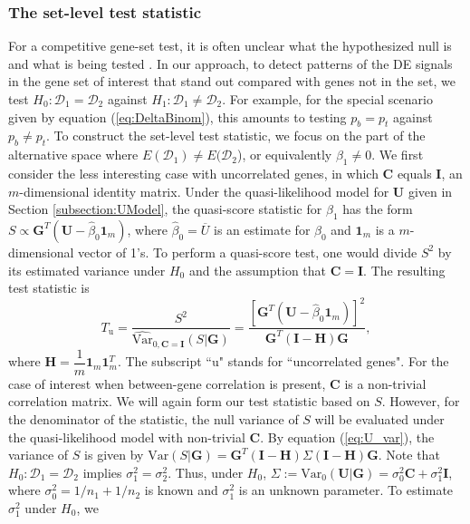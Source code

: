 \documentclass[a4,center,fleqn]{NAR}
\begin{document}
	
	\subsubsection{The set-level test statistic}\label{subsection:MEQL}
	For a competitive gene-set test, it is often unclear what the hypothesized null is and what is
	being tested \citep{barry2008statistical,wu2012camera}. In our approach, to detect patterns of 
	the DE signals in the gene set of interest that stand out compared with genes not in the set, 
	we test $H_0: \mathscr{D}_1=\mathscr{D}_2$ against $H_1: \mathscr{D}_1\ne\mathscr{D}_2$. For 
	example, for the special scenario given by equation (\ref{eq:DeltaBinom}), this amounts to 
	testing $p_{b}=p_{t}$ against $p_{b}\ne p_{t}$.
	To construct the set-level test statistic, we focus on the part of the alternative space where
	$E(\mathscr{D}_1)\ne E(\mathscr{D}_2$), or equivalently $\beta_1\ne 0$. We first consider the 
	less interesting case with uncorrelated genes, in which $\bm C$ equals $\bm I$, an 
	$m$-dimensional identity matrix. Under the quasi-likelihood model for $\bm U$ given in Section
	\ref{subsection:UModel},  the quasi-score statistic for $\beta_1$ has the form $S \propto \bm
	G^T(\bm U-\hat\beta_0\bm 1_m)$, where $\hat\beta_0=\overline{U}$ is an estimate for $\beta_0$ 
	and	$\bm 1_m$ is a $m$-dimensional vector of 1's. To perform a quasi-score test, one would 
	divide $S^2$ by its estimated variance under $H_0$ and the assumption that $\bm C=\bm I$. The 
	resulting test	statistic is 
	\begin{equation}
	T_{\text{u}} = \dfrac{S^2}{\widehat{\mbox{Var}}_{0, \bm C=\bm I}(S|\bm G)} = \dfrac{[\bm G^T(\bm
		U-\hat\beta_0\bm 1_m)]^2}{\bm G^T(\bm I-\bm H)\bm G}, 
	\end{equation}
	where $\bm H = \dfrac{1}{m}\bm 1_m\bm 1_m^T$. The subscript ``u" stands for ``uncorrelated 
	genes".	For the case of interest when between-gene correlation is present, $\bm C$ is a 
	non-trivial	correlation matrix. We will again form our test statistic based on $S$. However, 
	for the	denominator of the statistic, the null variance of $S$ will be evaluated under the 
	quasi-likelihood
	model with non-trivial $\bm C$. By equation (\ref{eq:U_var}), the variance of $S$ is given by
	$\mbox{Var}(S|\bm G) = \bm G^T(\bm I-\bm H)\Sigma(\bm I-\bm H)\bm G$. Note that $H_0:
	\mathscr{D}_1=\mathscr{D}_2$ implies $\sigma_1^2=\sigma_2^2$. Thus, under $H_0$,
	$\Sigma:=\mbox{Var}_{0}(\bm U|\bm G)=\sigma_0^2\bm C+\sigma_1^2\bm I$, where 
	$\sigma_0^2=1/n_1+1/n_2$
	is known and $\sigma_1^2$ is an unknown parameter. To estimate $\sigma_1^2$ under $H_0$, we 
\end{document}
